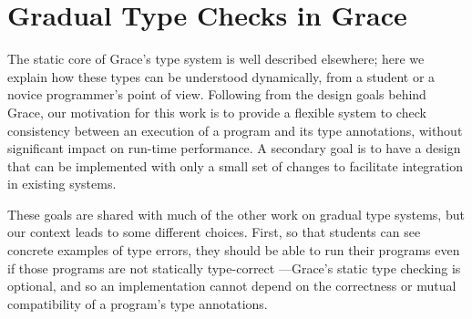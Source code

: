 
\section{Gradual Type Checks in Grace}
\label{sec:method}




%
%
The static core of Grace's type system is well described
elsewhere\citep{TimJonesThesis}; here we explain how
these types can be understood 
dynamically, from a student or a novice programmer's point of view.
Following from the design goals behind Grace,
our motivation for this work
is to provide a flexible system 
to check consistency between an execution of a program
and its type annotations,
without significant impact on run-time performance.
A secondary goal is to have a design that can be implemented with
only a small set of changes to facilitate integration in existing systems.
%
%


These goals are shared with much of the other work on gradual type
systems, but our context leads to some different choices. First, so
that students can see concrete examples of type errors, they should be
able to run their programs even if those programs are not statically type-correct%
---\ie Grace's static type checking is optional, and so an
implementation cannot depend on the correctness or mutual
compatibility of a program's type
annotations.

